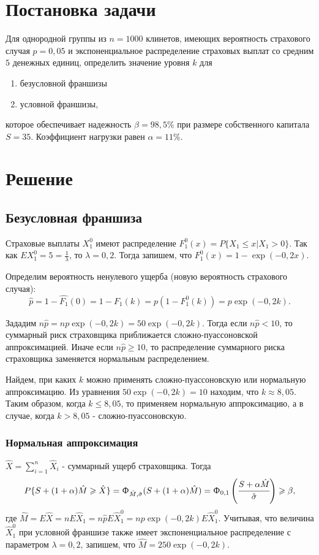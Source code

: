 \documentclass[a4paper,12pt]{article}
\begin{document}

\tableofcontents
\pagebreak

\section{Постановка задачи}
Для однородной группы из $n = 1000$ клинетов, имеющих вероятность страхового случая $p = 0,05$ и экспоненциальное распределение страховых выплат со средним $5$ денежных единиц, определить значение уровня $k$ для 
\begin{enumerate}
	\item безусловной франшизы
	\item условной франшизы,
\end{enumerate}
которое обеспечивает надежность $\beta = 98,5\%$ при размере собственного капитала $S = 35$. Коэффициент нагрузки равен $\alpha = 11\%$.

\section{Решение}

\subsection{Безусловная франшиза}
Страховые выплаты $X_1^0$ имеют распределение $F_1^0(x) = P\{X_1 \le x | X_1 > 0\}$. Так как $EX_1^0 = 5 = \frac{1}{\lambda}$, то $\lambda = 0,2$. Тогда запишем, что $F_1^0(x) = 1 - \exp(-0,2 x)$.

Определим вероятность ненулевого ущерба (новую вероятность страхового случая):
\[\hat{p} = 1 - \hat{F_1}(0) = 1 - F_1(k) = p (1 - F_1^0(k)) = p \exp(-0,2 k).\]

Зададим $n\hat{p} = np\exp(-0,2k) = 50 \exp (-0,2 k)$. Тогда если $n\hat{p} < 10$, то суммарный риск страховщика приближается сложно-пуассоновской аппроксимацией. Иначе если $n\hat{p} \ge 10$, то распределение суммарного риска страховщика заменяется нормальным распределением.

Найдем, при каких $k$ можно применять сложно-пуассоновскую или нормальную аппроксимацию. Из уравнения $50 \exp (-0,2 k) = 10$ находим, что $k \approx 8,05$. Таким образом, когда $k \le 8,05$, то применяем нормальную аппроксимацию, а в случае, когда $k > 8,05$ - сложно-пуассоновскую.

\subsubsection{Нормальная аппроксимация}
$\hat{X} = \sum_{i=1}^{n} \hat{X}_i$ - суммарный ущерб страховщика. Тогда \[P\{S + (1 + \alpha)\hat{M} \ge \hat{X}\} = \Upphi_{\hat{M}, \hat{\sigma}}(S + (1 + \alpha)\hat{M}) = \Upphi_{0, 1}\left(\cfrac{S + \alpha\hat{M}}{\hat{\sigma}}\right) \ge \beta,\]
где $\hat{M} = E\hat{X} = nE\hat{X}_1 = n\hat{p}E\hat{X}_1^0 = np\exp(-0,2k)E\hat{X}_1^0$. Учитывая, что величина $\hat{X}_1^0$ при условной франшизе также имеет экспоненциальное распределение с параметром $\lambda = 0,2$, запишем, что $\hat{M} = 250\exp(-0,2k)$.
 
\end{document}
